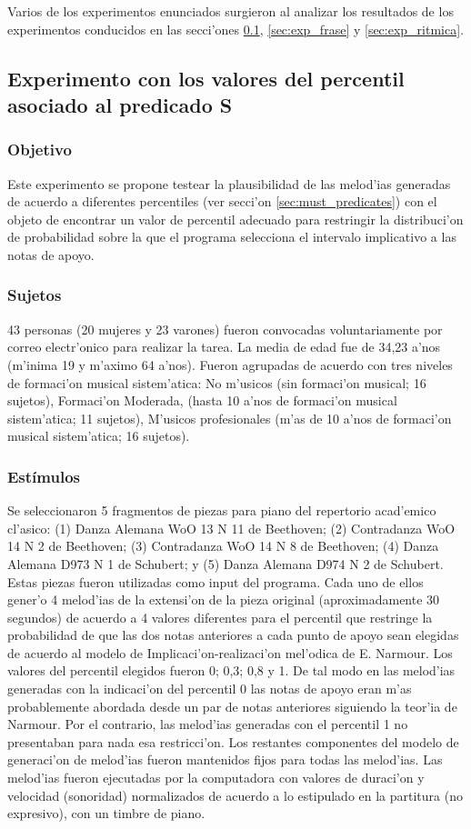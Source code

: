 Varios de los experimentos enunciados surgieron al analizar los resultados de los experimentos conducidos en las secci'ones \ref{sec:exp_percentiles}, 
\ref{sec:exp_frase} y \ref{sec:exp_ritmica}.

\subsection{Experimento con los valores del percentil asociado al predicado S}
\label{sec:exp_percentiles}
\subsubsection{Objetivo}
Este experimento se propone testear la plausibilidad de las melod'ias generadas de acuerdo a diferentes percentiles (ver secci'on \ref{sec:must_predicates})
con el objeto de encontrar un valor de percentil adecuado para restringir la distribuci'on de probabilidad sobre la que el programa selecciona el 
intervalo implicativo a las notas de apoyo.

\subsubsection{Sujetos}
43 personas (20 mujeres y 23 varones) fueron convocadas voluntariamente por correo electr'onico para realizar la tarea. La media de edad fue de 34,23 a'nos 
(m'inima 19 y m'aximo 64 a'nos). Fueron agrupadas de acuerdo con tres niveles de formaci'on musical sistem'atica: No m'usicos (sin formaci'on musical; 16 sujetos), 
Formaci'on Moderada, (hasta 10 a'nos de formaci'on musical sistem'atica; 11 sujetos), M'usicos profesionales (m'as de 10 a'nos de formaci'on musical sistem'atica; 16 sujetos).

\subsubsection{Est\'imulos}
Se seleccionaron 5 fragmentos de piezas para piano del repertorio acad'emico cl'asico: (1) Danza Alemana WoO 13 N 11 de Beethoven; (2) Contradanza WoO 14 N 2 de Beethoven;
(3) Contradanza WoO 14 N 8 de Beethoven; (4) Danza Alemana D973 N 1 de Schubert; y (5) Danza Alemana D974 N 2 de Schubert. Estas piezas fueron utilizadas como input del 
programa. Cada uno de ellos gener'o 4 melod'ias de la extensi'on de la pieza original (aproximadamente 30 segundos) de acuerdo a 4 valores diferentes para el percentil 
que restringe la probabilidad de que las dos notas anteriores a cada punto de apoyo sean elegidas de acuerdo al modelo de Implicaci'on-realizaci'on mel'odica de 
E. Narmour. Los valores del percentil elegidos fueron 0; 0,3; 0,8 y 1. De tal modo en las melod'ias generadas con la indicaci'on del percentil 0 las notas de apoyo 
eran m'as probablemente abordada desde un par de notas anteriores siguiendo la teor'ia de Narmour. Por el contrario, las melod'ias generadas con el percentil 1 no 
presentaban para nada esa restricci'on. Los restantes componentes del modelo de generaci'on de melod'ias fueron mantenidos fijos para todas las melod'ias. Las melod'ias 
fueron ejecutadas por la computadora con valores de duraci'on y velocidad (sonoridad) normalizados de acuerdo a lo estipulado en la partitura (no expresivo), 
con un timbre de piano.

